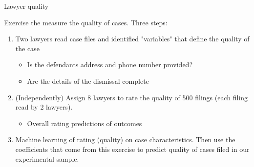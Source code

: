 \documentclass[8pt]{beamer}
\begin{document}
\begin{frame}{Lawyer quality}

Exercise the measure the quality of cases. Three steps:
\begin{enumerate}
    \item Two lawyers read case files and identified "variables" that define the quality of the case
    \begin{itemize}
        \item Is the defendants address and phone number provided?
        \item Are the details of the dismissal complete
    \end{itemize}
    \item (Independently) Assign 8 lawyers to rate the quality of 500 filings (each filing read by 2 lawyers). 
    \begin{itemize}
        \item Overall rating
        \incentivized predictions of outcomes
    \end{itemize}
    \item Machine learning of rating (quality) on case characteristics. Then use the coefficients that come from this exercise to predict quality of cases filed in our experimental sample. 
\end{enumerate}
\end{frame}
\end{document}
